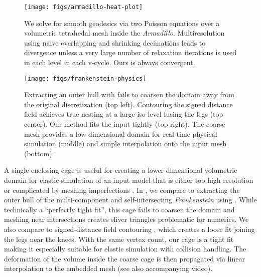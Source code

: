 \begin{figure}
  \texttt{[image: figs/armadillo-heat-plot]}
  \caption{We solve for smooth geodesics via two Poisson equations over a
  volumetric tetrahedal mesh inside the \emph{Armadillo}. Multiresolution using
  naive overlapping and shrinking decimations leads to divergence unless a very
  large number of relaxation iterations is used in each level in each v-cycle.
  Ours is always convergent.}
  \label{fig:armadillo-heat-plot}
\end{figure}

\begin{figure}
  \texttt{[image: figs/frankenstein-physics]}
  \caption{Extracting an outer hull with \protect\cite{Jacobson:WN:2013} fails
  to coarsen the domain away from the original discretization (top left). Contouring
  the signed distance field \protect\cite{Xu:2014:SDF} achieves true nesting at
  a large iso-level fusing the legs (top center). Our method fits the input
  tightly (top right). The coarse mesh provides a low-dimensional domain for
  real-time physical simulation (middle) and simple interpolation onto the
  input mesh (bottom).}
  \label{fig:frankenstein-physics}
\end{figure}

A single enclosing cage is useful for creating a lower dimensional volumetric
domain for elastic simulation of an input model that is either too high
resolution or complicated by meshing imperfections \cite{Xu:2014:SDF}.
%
In , we compare to extracting the outer hull of
the multi-component and self-intersecting \emph{Frankenstein} using
\cite{Jacobson:WN:2013}.
%
While technically a ``perfectly tight fit'', this cage fails to coarsen the
domain and meshing near intersections creates sliver triangles problematic for
numerics.
%
%
We also compare to signed-distance field contouring \cite{Xu:2014:SDF}, which
creates a loose fit joining the legs near the knees.
%
With the same vertex count, our cage is a tight fit making it especially
suitable for elastic simulation with collision handling.
%
The deformation of the volume inside the coarse cage is then propagated via
linear interpolation to the embedded mesh (see also accompanying video).

